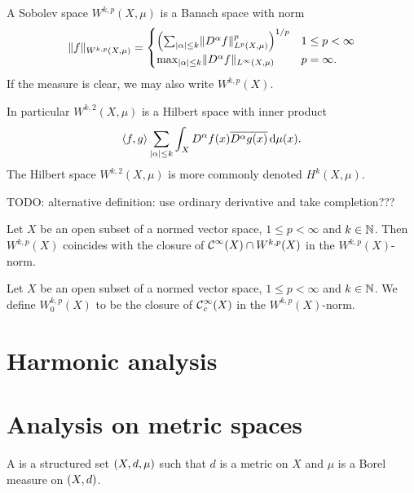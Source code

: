 \begin{proposition}
A Sobolev space $W^{k,p}(X,\mu)$ is a Banach space with norm
\[ \lVert f\rVert_{W^{k,p}(X,\mu)} = \begin{cases}
\left(\sum_{|\alpha|\leq k}\lVert D^\alpha f\rVert^p_{L^{p}(X, \mu)}\right)^{1/p} & 1\leq p < \infty \\
\max_{|\alpha|\leq k} \lVert D^\alpha f\rVert_{L^{\infty}(X, \mu)} & p = \infty.
\end{cases} \]
If the measure is clear, we may also write $W^{k,p}(X)$.

In particular $W^{k,2}(X, \mu)$ is a Hilbert space with inner product
\[ \inner{f,g} \sum_{|\alpha| \leq k} \int_X D^\alpha f(x) \overline{D^\alpha g(x)}\diff{\mu(x)}. \]
The Hilbert space $W^{k,2}(X, \mu)$ is more commonly denoted $H^k(X, \mu)$.
\end{proposition}
TODO: alternative definition: use ordinary derivative and take completion???

\begin{proposition}
Let $X$ be an open subset of a normed vector space, $1\leq p < \infty$ and $k\in\mathbb{N}$. Then $W^{k,p}(X)$ coincides with the closure of $\operatorname{\mathcal{C}}^\infty(X) \cap W^{k,p}(X)$ in the $W^{k,p}(X)$-norm.
\end{proposition}

\begin{definition}
Let $X$ be an open subset of a normed vector space, $1\leq p < \infty$ and $k\in\mathbb{N}$. We define $W_0^{k,p}(X)$ to be the closure of $\operatorname{\mathcal{C}}^\infty_c(X)$ in the $W^{k,p}(X)$-norm.
\end{definition}


\chapter{Harmonic analysis}




\chapter{Analysis on metric spaces}
\begin{definition}
A  is a structured set $\sSet{X, d, \mu}$ such that $d$ is a metric on $X$ and $\mu$ is a Borel measure on $\sSet{X,d}$.
\end{definition}

